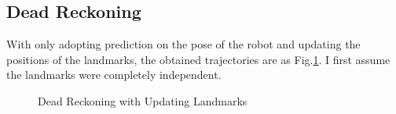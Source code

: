 \documentclass[conference]{IEEEtran}
\begin{document}
\subsection{Dead Reckoning}
With only adopting prediction on the pose of the robot and updating the 
positions of the landmarks, the obtained trajectories are as Fig.\ref{fig:dead_reckoning}. I first assume the landmarks 
were completely independent.

\begin{figure}[htbp]
    \centering

    \centering
    \caption{Dead Reckoning with Updating Landmarks} \label{fig:dead_reckoning}
\end{figure}
\end{document}
